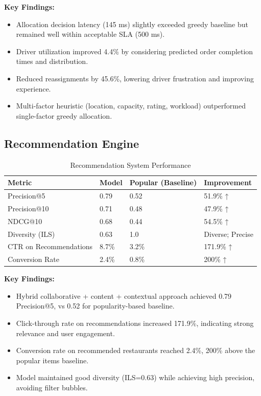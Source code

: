 \documentclass[12pt,a4paper]{report}
\begin{document}
\begin{itemize}
\textbf{Key Findings:}
\begin{itemize}
    \item Allocation decision latency (145 ms) slightly exceeded greedy baseline but remained well within acceptable SLA (500 ms).
    \item Driver utilization improved 4.4\% by considering predicted order completion times and distribution.
    \item Reduced reassignments by 45.6\%, lowering driver frustration and improving experience.
    \item Multi-factor heuristic (location, capacity, rating, workload) outperformed single-factor greedy allocation.
\end{itemize}

\subsection{Recommendation Engine}

\begin{table}[H]
\centering
\caption{Recommendation System Performance}
\begin{tabular}{p{3.5cm} p{1.8cm} p{1.8cm} p{2.5cm}}
\toprule
\textbf{Metric} & \textbf{Model} & \textbf{Popular (Baseline)} & \textbf{Improvement} \\
\midrule
Precision@5 & 0.79 & 0.52 & 51.9\% ↑ \\
Precision@10 & 0.71 & 0.48 & 47.9\% ↑ \\
NDCG@10 & 0.68 & 0.44 & 54.5\% ↑ \\
Diversity (ILS) & 0.63 & 1.0 & Diverse; Precise \\
CTR on Recommendations & 8.7\% & 3.2\% & 171.9\% ↑ \\
Conversion Rate & 2.4\% & 0.8\% & 200\% ↑ \\
\bottomrule
\end{tabular}
\end{table}

\textbf{Key Findings:}
\begin{itemize}
    \item Hybrid collaborative + content + contextual approach achieved 0.79 Precision@5, vs 0.52 for popularity-based baseline.
    \item Click-through rate on recommendations increased 171.9\%, indicating strong relevance and user engagement.
    \item Conversion rate on recommended restaurants reached 2.4\%, 200\% above the popular items baseline.
    \item Model maintained good diversity (ILS=0.63) while achieving high precision, avoiding filter bubbles.
\end{itemize}


\end{itemize}
\end{document}
